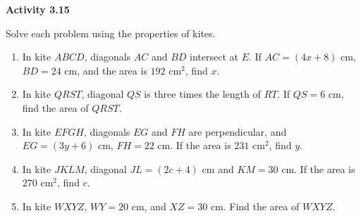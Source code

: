 \vspace{0.3ex}
\noindent\textbf{Activity 3.15}

\vspace{0.2ex}

Solve each problem using the properties of kites.

\begin{enumerate}[label=\color{blue}\arabic*.]
    \item In kite \(ABCD\), diagonals \(AC\) and \(BD\) intersect at \(E\). If \(AC = (4x + 8)\) cm, \(BD = 24\) cm, and the area is \(192\) cm\(^2\), find \(x\).
    \item In kite \(QRST\), diagonal \(QS\) is three times the length of \(RT\). If \(QS = 6\) cm, find the area of \(QRST\).
    \item In kite \(EFGH\), diagonals \(EG\) and \(FH\) are perpendicular, and \(EG = (3y + 6)\) cm, \(FH = 22\) cm. If the area is \(231\) cm\(^2\), find \(y\).
    \item In kite \(JKLM\), diagonal \(JL = (2c + 4)\) cm and \(KM = 30\) cm. If the area is \(270\) cm\(^2\), find \(c\).
    \item In kite \(WXYZ\), \(WY = 20\) cm, and \(XZ = 30\) cm. Find the area of \(WXYZ\).
\end{enumerate}
